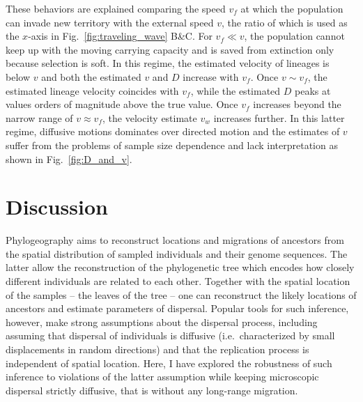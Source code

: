 \documentclass[aps,rmp, twocolumn]{revtex4}
\newcommand{\vfkpp}{v_f}
\begin{document}
These behaviors are explained comparing the speed $\vfkpp$ at which the population can invade new territory with the external speed $v$, the ratio of which is used as the $x$-axis in Fig.~\ref{fig:traveling_wave} B\&C.
For $\vfkpp \ll v$, the population cannot keep up with the moving carrying capacity and is saved from extinction only because selection is soft.
In this regime, the estimated velocity of lineages is below $v$ and both the estimated $v$ and $D$ increase with $\vfkpp$.
Once $v\sim \vfkpp$, the estimated lineage velocity coincides with $\vfkpp$, while the estimated $D$ peaks at values orders of magnitude above the true value.
Once $\vfkpp$ increases beyond the narrow range of $v\approx\vfkpp$, the velocity estimate $v_w$ increases further.
In this latter regime, diffusive motions dominates over directed motion and the estimates of $v$ suffer from the problems of sample size dependence and lack interpretation as shown in Fig.~\ref{fig:D_and_v}.


\section*{Discussion}
Phylogeography aims to reconstruct locations and migrations of ancestors from the spatial distribution of sampled individuals and their genome sequences.
The latter allow the reconstruction of the phylogenetic tree which encodes how closely different individuals are related to each other.
Together with the spatial location of the samples -- the leaves of the tree -- one can reconstruct the likely locations of ancestors and estimate parameters of dispersal.
Popular tools for such inference, however, make strong assumptions about the dispersal process, including assuming that dispersal of individuals is diffusive (i.e.~characterized by small displacements in random directions) and that the replication process is independent of spatial location.
Here, I have explored the robustness of such inference to violations of the latter assumption while keeping microscopic dispersal strictly diffusive, that is without any long-range migration.
\end{document}

